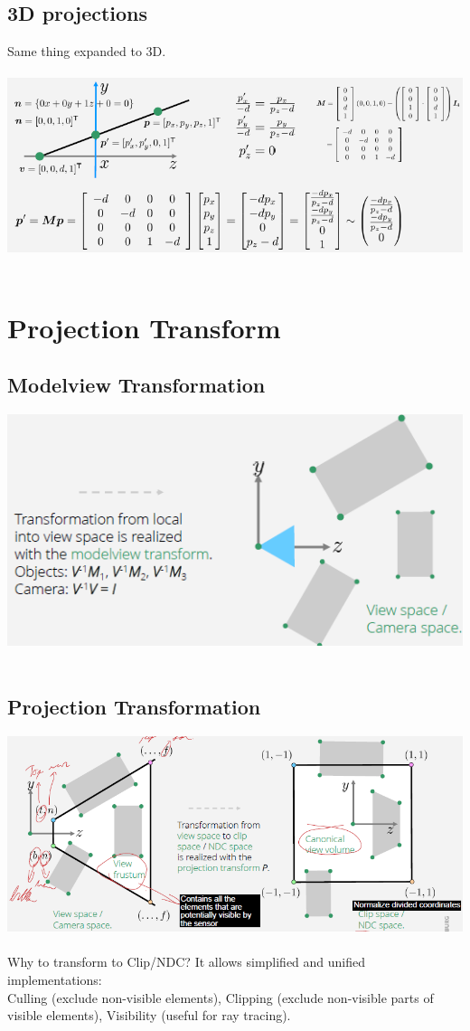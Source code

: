 \documentclass{article}
\begin{document}
\subsection{3D projections}
Same thing expanded to 3D.\\\\
\includegraphics[scale=0.6]{image38.png}\\\\
\section{Projection Transform}
\subsection{Modelview Transformation}
\includegraphics[scale=0.6]{image39.png}\\\\
\subsection{Projection Transformation}
\includegraphics[scale=0.6]{image40.png}\\\\
Why to transform to Clip/NDC? It allows simplified and unified implementations:\\
Culling (exclude non-visible elements), Clipping (exclude non-visible parts of visible elements), Visibility (useful for ray tracing).\\
\end{document}
